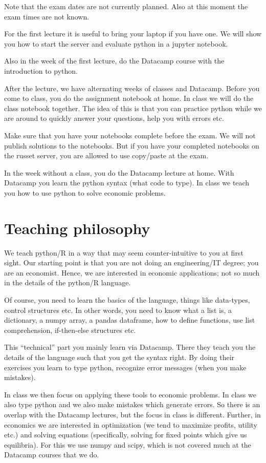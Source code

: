 \documentclass[]{book}
\begin{document}
Note that the exam dates are not currently planned. Also at this moment
the exam times are not known.

For the first lecture it is useful to bring your laptop if you have one.
We will show you how to start the server and evaluate python in a
jupyter notebook.

Also in the week of the first lecture, do the Datacamp course with the
introduction to python.

After the lecture, we have alternating weeks of classes and Datacamp.
Before you come to class, you do the assignment notebook at home. In
class we will do the class notebook together. The idea of this is that
you can practice python while we are around to quickly answer your
questions, help you with errors etc.

Make sure that you have your notebooks complete before the exam. We will
not publish solutions to the notebooks. But if you have your completed
notebooks on the russet server, you are allowed to use copy/paste at the
exam.

In the week without a class, you do the Datacamp lecture at home. With
Datacamp you learn the python syntax (what code to type). In class we
teach you how to use python to solve economic problems.

\section{Teaching philosophy}\label{teaching-philosophy}

We teach python/R in a way that may seem counter-intuitive to you at
first sight. Our starting point is that you are not doing an
engineering/IT degree; you are an economist. Hence, we are interested in
economic applications; not so much in the details of the python/R
language.

Of course, you need to learn the basics of the language, things like
data-types, control structures etc. In other words, you need to know
what a list is, a dictionary, a numpy array, a pandas dataframe, how to
define functions, use list comprehension, if-then-else structures etc.

This ``technical'' part you mainly learn via Datacamp. There they teach
you the details of the language such that you get the syntax right. By
doing their exercises you learn to type python, recognize error messages
(when you make mistakes).

In class we then focus on applying these tools to economic problems. In
class we also type python and we also make mistakes which generate
errors. So there is an overlap with the Datacamp lectures, but the focus
in class is different. Further, in economics we are interested in
optimization (we tend to maximize profits, utility etc.) and solving
equations (specifically, solving for fixed points which give us
equilibria). For this we use numpy and scipy, which is not covered much
at the Datacamp courses that we do.
\end{document}
